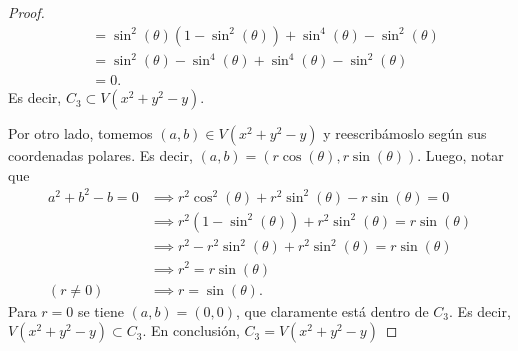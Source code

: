 \documentclass{amsart}
\theoremstyle{plain}
\begin{document}
\begin{proof}
\begin{align*}
			&= \sin^{2}(\theta)(1 - \sin^{2}(\theta)) + \sin^{4}(\theta) - \sin^{2}(\theta) \\
			&= \sin^{2}(\theta) - \sin^{4}(\theta) + \sin^{4}(\theta) - \sin^{2}(\theta) \\
			&= 0
		.\end{align*}
		Es decir, $C_{3} \subset V(x^{2} + y^{2} - y)$. \par
		Por otro lado, tomemos $(a,b) \in V(x^{2} + y^{2} - y)$ y reescribámoslo según sus coordenadas polares. Es decir, $(a,b) = (r \cos(\theta), r \sin(\theta))$. Luego, notar que
		\begin{align*}
			a^{2} + b^{2} - b = 0 &\implies r^{2} \cos^{2}(\theta) + r^{2} \sin^{2}(\theta) - r \sin(\theta) = 0 \\
			&\implies r^{2}(1 - \sin^{2}(\theta)) + r^{2} \sin^{2}(\theta) = r \sin(\theta) \\
			&\implies r^{2} - r^{2} \sin^{2}(\theta) + r^{2} \sin^{2}(\theta) = r \sin(\theta) \\
			&\implies r^{2} = r \sin(\theta) \\
			(r \neq 0) &\implies r = \sin(\theta)
		.\end{align*}
		Para $r = 0$ se tiene $(a,b) = (0,0)$, que claramente está dentro de $C_{3}$. Es decir, $V(x^{2} + y^{2} - y) \subset C_{3}$. En conclusión, $C_{3} = V(x^{2} + y^{2} - y)$
	\end{proof}
\end{document}
